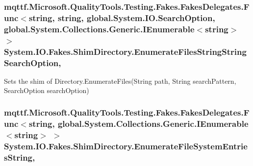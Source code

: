 \hypertarget{class_system_1_1_i_o_1_1_fakes_1_1_shim_directory_a0a77509033e94d408a48e27e4a9fbf5d}{
\subsubsection[{Enumerate\-Files\-String\-String\-Search\-Option}]{\setlength{\rightskip}{0pt plus 5cm}mqttf.\-Microsoft.\-Quality\-Tools.\-Testing.\-Fakes.\-Fakes\-Delegates.\-Func$<$string, string, global.\-System.\-I\-O.\-Search\-Option, global.\-System.\-Collections.\-Generic.\-I\-Enumerable$<$string$>$ $>$ System.\-I\-O.\-Fakes.\-Shim\-Directory.\-Enumerate\-Files\-String\-String\-Search\-Option\hspace{0.3cm}{\ttfamily [static]}, {\ttfamily [set]}}}\label{class_system_1_1_i_o_1_1_fakes_1_1_shim_directory_a0a77509033e94d408a48e27e4a9fbf5d}


Sets the shim of Directory.\-Enumerate\-Files(\-String path, String search\-Pattern, Search\-Option search\-Option)

\hypertarget{class_system_1_1_i_o_1_1_fakes_1_1_shim_directory_a672b51b834f58096553f5fb9bfd4dab2}{
\subsubsection[{Enumerate\-File\-System\-Entries\-String}]{\setlength{\rightskip}{0pt plus 5cm}mqttf.\-Microsoft.\-Quality\-Tools.\-Testing.\-Fakes.\-Fakes\-Delegates.\-Func$<$string, global.\-System.\-Collections.\-Generic.\-I\-Enumerable$<$string$>$ $>$ System.\-I\-O.\-Fakes.\-Shim\-Directory.\-Enumerate\-File\-System\-Entries\-String\hspace{0.3cm}{\ttfamily [static]}, {\ttfamily [set]}}}\label{class_system_1_1_i_o_1_1_fakes_1_1_shim_directory_a672b51b834f58096553f5fb9bfd4dab2}


